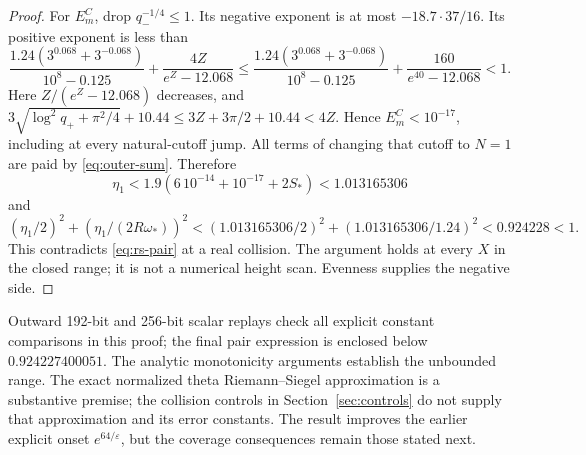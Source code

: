 \begin{proof}
For $E_m^C$, drop $q_-^{-1/4}\le1$. Its negative exponent
is at most $-18.7\cdot37/16$. Its positive exponent is less than
\[
 \frac{1.24(3^{0.068}+3^{-0.068})}{10^8-0.125}
 +\frac{4Z}{e^Z-12.068}
 \le
 \frac{1.24(3^{0.068}+3^{-0.068})}{10^8-0.125}
 +\frac{160}{e^{40}-12.068}<1.
\]
Here $Z/(e^Z-12.068)$ decreases, and
$3\sqrt{\log^2q_++\pi^2/4}+10.44
 \le3Z+3\pi/2+10.44<4Z$.
Hence $E_m^C<10^{-17}$, including at every natural-cutoff jump.
All terms of changing that cutoff to $N=1$ are paid by
\eqref{eq:outer-sum}. Therefore
\[
 \eta_1<1.9(6\,10^{-14}+10^{-17}+2S_*)<1.013165306
\]
and
\[
 (\eta_1/2)^2+(\eta_1/(2R\omega_*))^2
 <(1.013165306/2)^2+(1.013165306/1.24)^2
 <0.924228<1.
\]
This contradicts \eqref{eq:rs-pair} at a real collision.
The argument holds at every $X$ in the closed range; it is
not a numerical height scan. Evenness supplies the negative side.
\end{proof}

Outward 192-bit and 256-bit scalar replays check all explicit
constant comparisons in this proof; the final pair expression
is enclosed below $0.924227400051$. The analytic monotonicity
arguments establish the unbounded range. The exact normalized
theta Riemann--Siegel approximation is a substantive premise;
the collision controls in Section~\ref{sec:controls} do not
supply that approximation and its error constants.
The result improves the earlier explicit onset $e^{64/\varepsilon}$,
but the coverage consequences remain those stated next.
